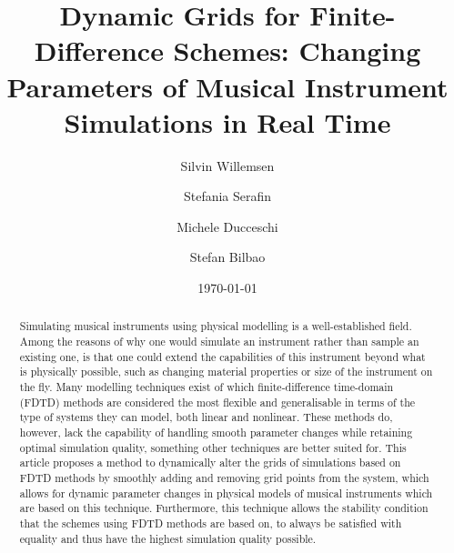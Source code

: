 \documentclass[dvipsnames, reprint]{JASA}
\begin{document}
\title[JASA/Dynamic Grids for Finite-Difference Schemes]{Dynamic Grids for Finite-Difference Schemes: Changing Parameters of Musical Instrument Simulations in Real Time}
\author{Silvin Willemsen}
\author{Stefania Serafin}

\author{Michele Ducceschi}
\author{Stefan Bilbao}
 



\date{\today} 

\begin{abstract}
Simulating musical instruments using physical modelling is a well-established field. Among the reasons of why one would simulate an instrument rather than sample an existing one, is that one could extend the capabilities of this instrument beyond what is physically possible, such as changing material properties or size of the instrument on the fly. Many modelling techniques exist of which finite-difference time-domain (FDTD) methods are considered the most flexible and generalisable in terms of the type of systems they can model, both linear and nonlinear. These methods do, however, lack the capability of handling smooth parameter changes while retaining optimal simulation quality, something other techniques are better suited for. This article proposes a method to dynamically alter the grids of simulations based on FDTD methods by smoothly adding and removing grid points from the system, which allows for dynamic parameter changes in physical models of musical instruments which are based on this technique. Furthermore, this technique allows the stability condition that the schemes using FDTD methods are based on, to always be satisfied with equality and thus have the highest simulation quality possible. 
\end{abstract}


\maketitle
\end{document}

